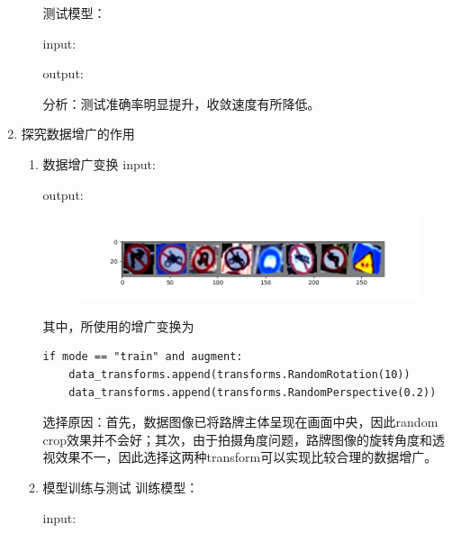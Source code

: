 \documentclass[a4paper]{article}
\begin{document}
\begin{enumerate}
\begin{enumerate}
        测试模型：

        input:
        

        output:
        

        分析：测试准确率明显提升，收敛速度有所降低。

    \end{enumerate}
    \vspace{2em}


    \item 探究数据增广的作用
    \begin{enumerate}
        \item 数据增广变换
        input:
        

        output:
        
        \begin{figure}[H]
            \centering
            \includegraphics[width=\linewidth]{../result/2_1.png}
            \caption{}
        \end{figure}

        其中，所使用的增广变换为
        \begin{lstlisting}[style=Python]
if mode == "train" and augment:
    data_transforms.append(transforms.RandomRotation(10))
    data_transforms.append(transforms.RandomPerspective(0.2))
        \end{lstlisting}

        选择原因：首先，数据图像已将路牌主体呈现在画面中央，因此random crop效果并不会好；其次，由于拍摄角度问题，路牌图像的旋转角度和透视效果不一，因此选择这两种transform可以实现比较合理的数据增广。
        \vspace{2em}

        \item 模型训练与测试
        训练模型：

        input:
        


\end{enumerate}
\end{enumerate}
\end{document}
